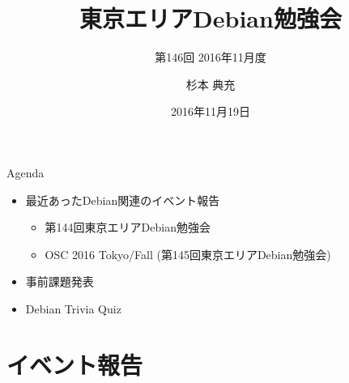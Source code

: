 \title{東京エリアDebian勉強会}
\subtitle{第146回 2016年11月度}
\author{杉本 典充}
\date{2016年11月19日}



\begin{frame}
\titlepage{}
\end{frame}

\begin{frame}{Agenda}
 \begin{minipage}[t]{0.45\hsize}
  \begin{itemize}
  \item 最近あったDebian関連のイベント報告
	\begin{itemize}
	\item 第144回東京エリアDebian勉強会
    \item OSC 2016 Tokyo/Fall (第145回東京エリアDebian勉強会)
	\end{itemize}
  \item 事前課題発表
  \end{itemize}
 \end{minipage}
 \begin{minipage}[t]{0.45\hsize}
  \begin{itemize}
   \item Debian Trivia Quiz
  \end{itemize}
 \end{minipage}
\end{frame}

\section{イベント報告}


